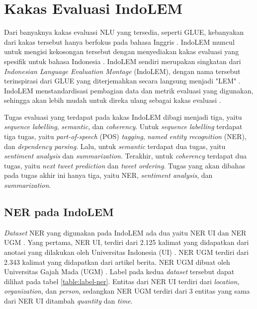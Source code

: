 \section{Kakas Evaluasi IndoLEM}

Dari banyaknya kakas evaluasi NLU yang tersedia, seperti GLUE, kebanyakan dari kakas tersebut hanya berfokus pada bahasa Inggris \parencite{indolem}. IndoLEM muncul untuk mengisi kekosongan tersebut dengan menyediakan kakas evaluasi yang spesifik untuk bahasa Indonesia \parencite{indolem}. IndoLEM sendiri merupakan singkatan dari \textit{Indonesian Language Evaluation Montage} (IndoLEM), dengan nama tersebut terinspirasi dari GLUE yang diterjemahkan secara langsung menjadi "LEM" \parencite{indolem}. IndoLEM menstandardisasi pembagian data dan metrik evaluasi yang digunakan, sehingga akan lebih mudah untuk direka ulang sebagai kakas evaluasi \parencite{indolem}.

Tugas evaluasi yang terdapat pada kakas IndoLEM dibagi menjadi tiga, yaitu \textit{sequence labelling}, \textit{semantic}, dan \textit{coherency}. Untuk \textit{sequence labelling} terdapat tiga tugas, yaitu \textit{part-of-speech} (POS) \textit{tagging}, \textit{named entity recognition} (NER), dan \textit{dependency parsing}. Lalu, untuk \textit{semantic} terdapat dua tugas, yaitu \textit{sentiment analysis} dan \textit{summarization}. Terakhir, untuk \textit{coherency} terdapat dua tugas, yaitu \textit{next tweet prediction} dan \textit{tweet ordering}. Tugas yang akan dibahas pada tugas akhir ini hanya tiga, yaitu NER, \textit{sentiment analysis}, dan \textit{summarization}.

\subsection{NER pada IndoLEM}

\textit{Dataset} NER yang digunakan pada IndoLEM ada dua yaitu NER UI dan NER UGM \parencite{indolem}. Yang pertama, NER UI, terdiri dari 2.125 kalimat yang didapatkan dari anotasi yang dilakukan oleh Universitas Indonesia (UI) \parencite{indolem}. NER UGM terdiri dari 2.343 kalimat yang didapatkan dari artikel berita. NER UGM dibuat oleh Universitas Gajah Mada (UGM) \parencite{indolem}. Label pada kedua \textit{dataset} tersebut dapat dilihat pada tabel \ref{table:label-ner}. Entitas dari NER UI terdiri dari \textit{location, organization}, dan \textit{person}, sedangkan NER UGM terdiri dari 3 entitas yang sama dari NER UI ditambah \textit{quantity} dan \textit{time}.


